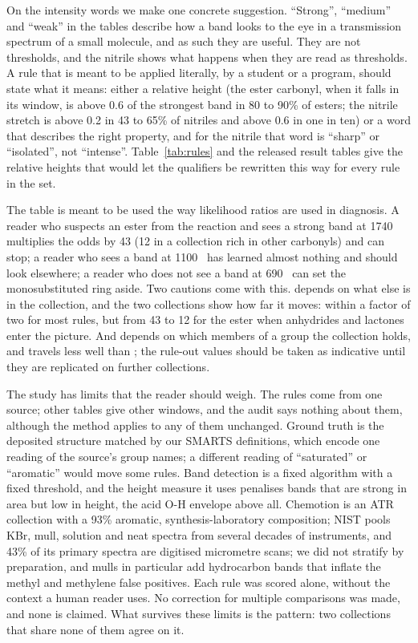 On the intensity words we make one concrete suggestion. ``Strong'', ``medium'' and ``weak'' in the tables describe how a band looks to the eye in a transmission spectrum of a small molecule, and as such they are useful. They are not thresholds, and the nitrile shows what happens when they are read as thresholds. A rule that is meant to be applied literally, by a student or a program, should state what it means: either a relative height (the ester carbonyl, when it falls in its window, is above 0.6 of the strongest band in 80 to 90\% of esters; the nitrile stretch is above 0.2 in 43 to 65\% of nitriles and above 0.6 in one in ten) or a word that describes the right property, and for the nitrile that word is ``sharp'' or ``isolated'', not ``intense''. Table~\ref{tab:rules} and the released result tables give the relative heights that would let the qualifiers be rewritten this way for every rule in the set.

The table is meant to be used the way likelihood ratios are used in diagnosis. A reader who suspects an ester from the reaction and sees a strong band at 1740~\wn{} multiplies the odds by 43 (12 in a collection rich in other carbonyls) and can stop; a reader who sees a band at 1100~\wn{} has learned almost nothing and should look elsewhere; a reader who does not see a band at 690~\wn{} can set the monosubstituted ring aside. Two cautions come with this. \LRp{} depends on what else is in the collection, and the two collections show how far it moves: within a factor of two for most rules, but from 43 to 12 for the ester when anhydrides and lactones enter the picture. And \LRn{} depends on which members of a group the collection holds, and travels less well than \LRp{}; the rule-out values should be taken as indicative until they are replicated on further collections.

The study has limits that the reader should weigh. The rules come from one source; other tables give other windows, and the audit says nothing about them, although the method applies to any of them unchanged. Ground truth is the deposited structure matched by our SMARTS definitions, which encode one reading of the source's group names; a different reading of ``saturated'' or ``aromatic'' would move some rules. Band detection is a fixed algorithm with a fixed threshold, and the height measure it uses penalises bands that are strong in area but low in height, the acid O-H envelope above all. Chemotion is an ATR collection with a 93\% aromatic, synthesis-laboratory composition; NIST pools KBr, mull, solution and neat spectra from several decades of instruments, and 43\% of its primary spectra are digitised micrometre scans; we did not stratify by preparation, and mulls in particular add hydrocarbon bands that inflate the methyl and methylene false positives. Each rule was scored alone, without the context a human reader uses. No correction for multiple comparisons was made, and none is claimed. What survives these limits is the pattern: two collections that share none of them agree on it.

